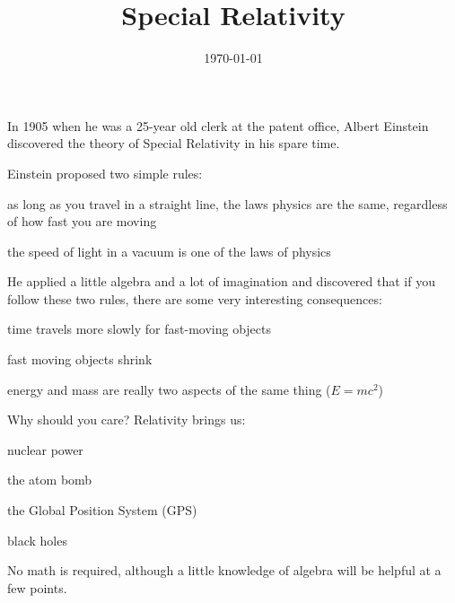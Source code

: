 \documentclass[fleqn]{article}
\title{Special Relativity}
\date{\today}
\begin{document}
\maketitle

In 1905 when he was a 25-year old clerk at the patent office, Albert Einstein discovered the theory of Special Relativity in
his spare time.

Einstein proposed two simple rules:
\begin{itemize*}
  \item as long as you travel in a straight line, the laws physics are the same, regardless of how fast you are moving
  \item the speed of light in a vacuum is one of the laws of physics
\end{itemize*}

He applied a little algebra and a lot of imagination and discovered that if you follow these two rules, there are some
very interesting consequences:
\begin{itemize*}
  \item time travels more slowly for fast-moving objects
  \item fast moving objects shrink
  \item energy and mass are really two aspects of the same thing ($E=mc^2$)
\end{itemize*}

Why should you care?  Relativity brings us:
\begin{itemize*}
  \item nuclear power
  \item the atom bomb
  \item the Global Position System (GPS)
  \item black holes
\end{itemize*}

No math is required, although a little knowledge of algebra will be helpful at a few points.
\end{document}
